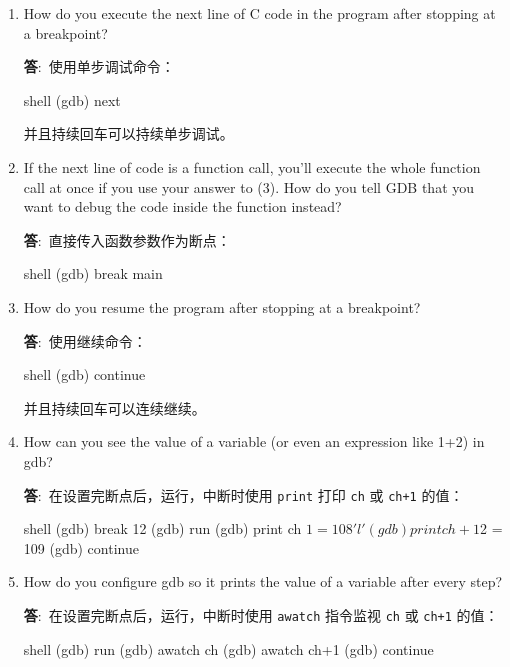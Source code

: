 \documentclass[12pt,a4paper]{article}
\newenvironment{problems}{\begin{list}{}{\renewcommand{\makelabel}[1]{\textbf{##1}.\hfil}}}{\end{list}}
\providecommand{\ans}{\textbf{答}:~}
\begin{document}
\begin{problems}
\begin{enumerate}[(1)]
        \item How do you execute the next line of C code in the program after stopping at a breakpoint?
        
        \ans 使用单步调试命令：
        \begin{code}{shell}
            (gdb) next
        \end{code}
        并且持续回车可以持续单步调试。

        \item If the next line of code is a function call, you'll execute the whole function call at once if you use  your  answer  to (3).  How  do  you  tell GDB that  you  want  to  debug  the  code inside  the function instead?
        
        \ans 直接传入函数参数作为断点：
        \begin{code}{shell}
            (gdb) break main
        \end{code}

        \item How do you resume the program after stopping at a breakpoint?
        
        \ans 使用继续命令：
        \begin{code}{shell}
            (gdb) continue
        \end{code}
        并且持续回车可以连续继续。

        \item How can you see the value of a variable (or even an expression like 1+2) in gdb?
        
        \ans 在设置完断点后，运行，中断时使用 \texttt{print} 打印 \texttt{ch} 或 \texttt{ch+1} 的值：
        \begin{code}{shell}
            (gdb) break 12
            (gdb) run
            (gdb) print ch
            $1 = 108 'l'
            (gdb) print ch+1
            $2 = 109
            (gdb) continue
        \end{code}

        \item How do you configure gdb so it prints the value of a variable after every step?
        
        \ans 在设置完断点后，运行，中断时使用 \texttt{awatch} 指令监视 \texttt{ch} 或 \texttt{ch+1} 的值：
        \begin{code}{shell}
            (gdb) run
            (gdb) awatch ch
            (gdb) awatch ch+1
            (gdb) continue
        \end{code}


\end{enumerate}
\end{problems}
\end{document}
